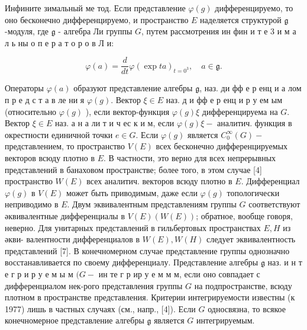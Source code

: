 \documentclass[10pt]{article}
\begin{document}
Инфините зимальный ме тод. Если представление $\varphi(g)$ дифференцируемо, то оно бесконечно дифференцируемо, и пространство $E$ наделяется структурой $\mathfrak{g}$-модуля, где $\mathfrak{g}$ - алгебра Ли группы $G$, путем рассмотрения ин фин и т е 3 и м а л ь ны о п е р а т о р о в Л и:



\[

\varphi(a)=\frac{d}{d t} \varphi(\exp t a)_{t=0^{3}}, \quad a \in \mathfrak{g} .

\]



Операторы $\varphi(a)$ образуют представление алгебры $\mathfrak{g}$, наз. ди фф е р енц и а лом п р е д с т а в ле ни я $\varphi(g)$. Вектор $\xi \in E$ наз. д и фф е р енц и р у ем ым (относительно $\varphi(g)$ ), если вектор-функция $\varphi(g) \xi$ дифференцируема на $G$. Вектор $\xi \in E$ наз. а н а ли т и ч ес к и м, если $\varphi(g) \xi-$ аналитич. функция в окрестности единичной точки $e \in G$. Если $\varphi(g)$ является $C_{0}^{\infty}(G)-$ представлением, то пространство $V(E)$ всех бесконечно дифференцируемых векторов всюду плотно в $E$. В частности, это верно для всех непрерывных представлений в банаховом пространстве; более того, в этом случае [4] пространство $W(E)$ всех аналитич. векторов всюду плотно в $E$. Дифференциал $\varphi(g)$ в $V(E)$ может быть приводимым, даже если $\varphi(g)$ топологически неприводимо в $E$. Двум эквивалентным представлениям группы $G$ соответствуют әквивалентные дифференциалы в $V(E)(W(E))$; обратное, вообще говоря, неверно. Для унитарных представлений в гильбертовых пространствах $E, H$ из әкви- валентности дифференциалов в $W(E), W(H)$ следует эквивалентность представлений [7]. В конечномерном случае представление группы однозначно восстанавливается по своему дифференциалу. Представление алгебры $\mathfrak{g}$ наз. и н т е г р и р у е м ы м $(G-$ ин те г р ир у е м м м, если оно совпадает с дифференциалом нек-рого представления группы $G$ на подпространстве, всюду плотном в пространстве представления. Критерии интегрируемости известны (к 1977) лишь в частных случаях (см., напр., [4]). Если $G$ односвязна, то всякое конечномерное представление алгебры $\mathfrak{g}$ является $G$ интегрируемым.
\end{document}
